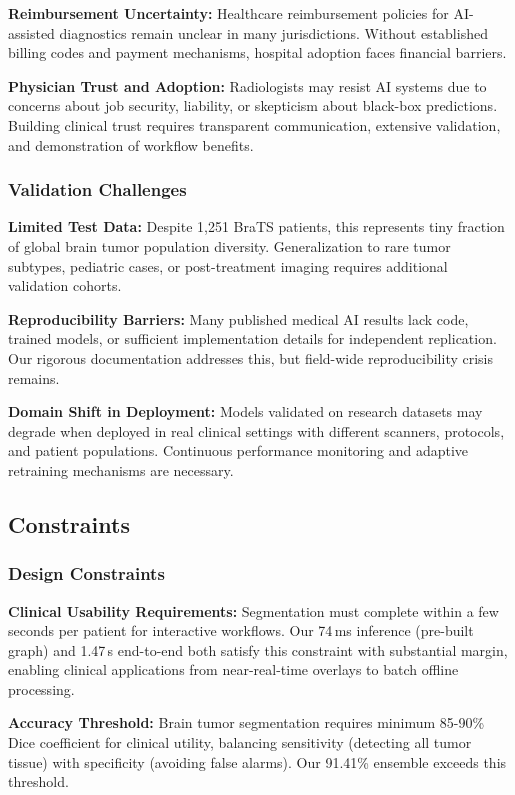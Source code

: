 \textbf{Reimbursement Uncertainty:} Healthcare reimbursement policies for AI-assisted diagnostics remain unclear in many jurisdictions. Without established billing codes and payment mechanisms, hospital adoption faces financial barriers.

\textbf{Physician Trust and Adoption:} Radiologists may resist AI systems due to concerns about job security, liability, or skepticism about black-box predictions. Building clinical trust requires transparent communication, extensive validation, and demonstration of workflow benefits.

\subsubsection{Validation Challenges}

\textbf{Limited Test Data:} Despite 1,251 BraTS patients, this represents tiny fraction of global brain tumor population diversity. Generalization to rare tumor subtypes, pediatric cases, or post-treatment imaging requires additional validation cohorts.

\textbf{Reproducibility Barriers:} Many published medical AI results lack code, trained models, or sufficient implementation details for independent replication. Our rigorous documentation addresses this, but field-wide reproducibility crisis remains.

\textbf{Domain Shift in Deployment:} Models validated on research datasets may degrade when deployed in real clinical settings with different scanners, protocols, and patient populations. Continuous performance monitoring and adaptive retraining mechanisms are necessary.


\subsection{Constraints}

\subsubsection{Design Constraints}

\textbf{Clinical Usability Requirements:} Segmentation must complete within a few seconds per patient for interactive workflows. Our 74\,ms inference (pre-built graph) and 1.47\,s end-to-end both satisfy this constraint with substantial margin, enabling clinical applications from near-real-time overlays to batch offline processing.

\textbf{Accuracy Threshold:} Brain tumor segmentation requires minimum 85-90\% Dice coefficient for clinical utility, balancing sensitivity (detecting all tumor tissue) with specificity (avoiding false alarms). Our 91.41\% ensemble exceeds this threshold.

